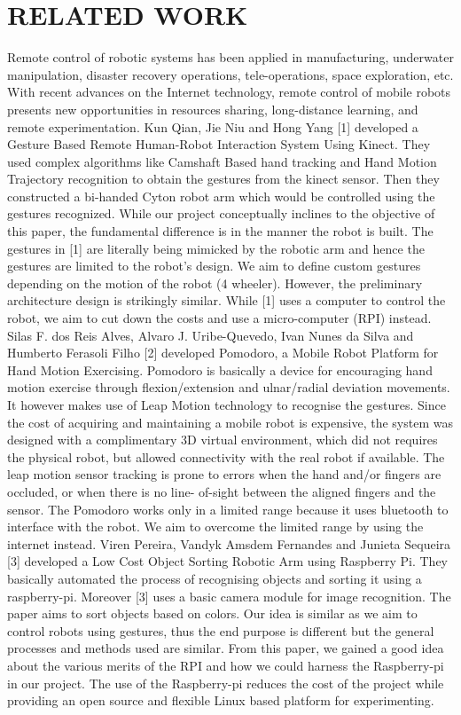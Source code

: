 \chapter{RELATED WORK} %
Remote control of robotic systems has been applied in manufacturing, underwater manipulation, disaster recovery operations, tele-operations, space exploration, etc. With recent advances on the Internet technology, remote control of mobile robots presents new opportunities in resources sharing, long-distance learning, and remote experimentation. Kun Qian, Jie Niu and Hong Yang [1] developed a Gesture Based Remote Human-Robot Interaction System Using Kinect. They used complex algorithms like Camshaft Based hand tracking and Hand Motion Trajectory recognition to obtain the gestures from the kinect sensor. Then they constructed a bi-handed Cyton robot arm which would be controlled using the gestures recognized. While our project conceptually inclines to the objective of this paper, the fundamental difference is in the manner the robot is built. The gestures in [1] are literally being mimicked by the robotic arm and hence the gestures are limited to the robot's design. We aim to define custom gestures depending on the motion of the robot (4 wheeler). However, the preliminary architecture design is strikingly similar. While [1] uses a computer to control the robot, we aim to cut down the costs and use a micro-computer (RPI) instead.
Silas F. dos Reis Alves, Alvaro J. Uribe-Quevedo, Ivan Nunes da Silva and Humberto Ferasoli Filho [2] developed Pomodoro, a Mobile Robot Platform for Hand Motion Exercising. Pomodoro is basically a device for encouraging hand motion exercise through flexion/extension and ulnar/radial deviation movements. It however makes use of Leap Motion technology to recognise the gestures. Since the cost of acquiring and maintaining a mobile robot is expensive, the system was designed with a complimentary 3D virtual environment, which did not requires the physical robot, but allowed connectivity with the real robot if available. The leap motion sensor tracking is prone to errors when the hand and/or fingers are occluded, or when there is no line- of-sight between the aligned fingers and the sensor. The Pomodoro works only in a limited range because it uses bluetooth to interface with the robot.
We aim to overcome the limited range by using the internet instead. Viren Pereira, Vandyk Amsdem Fernandes and Junieta Sequeira [3] developed a Low Cost Object Sorting Robotic Arm using Raspberry Pi. They basically automated the process of recognising objects and sorting it using a raspberry-pi. Moreover [3] uses a basic camera module for image recognition. The paper aims to sort objects based on colors. Our idea is similar as we aim to control robots using gestures, thus the end purpose is different but the general processes and methods used are similar. From this paper, we gained a good idea about the various merits of the RPI and how we could harness the Raspberry-pi in our project. The use of the Raspberry-pi reduces the cost of the project while providing an open source and flexible Linux based platform for experimenting.
